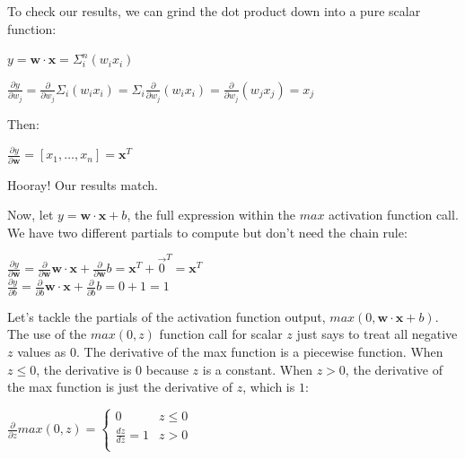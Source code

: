 \documentclass[11pt]{article}
\begin{document}
To check our results, we can grind the dot product down into a pure scalar function:

$y = \mathbf{w} \cdot \mathbf{x} = \Sigma_i^n (w_i x_i)$

$\frac{\partial y}{\partial w_j} = \frac{\partial}{\partial w_j} \Sigma_i (w_i x_i) = \Sigma_i \frac{\partial}{\partial w_j} (w_i x_i) = \frac{\partial}{\partial w_j} (w_j x_j) = x_j$

Then:

$\frac{\partial y}{\partial \mathbf{w}} = [ x_1, \ldots, x_n ] = \mathbf{x}^T$

Hooray! Our results match. 

Now, let $y = \mathbf{w} \cdot \mathbf{x} + b$, the full expression within the $max$ activation function call. We have two different partials to compute but don't need the chain rule:

$\frac{\partial y}{\partial \mathbf{w}} = \frac{\partial }{\partial \mathbf{w}}\mathbf{w} \cdot \mathbf{x} + \frac{\partial }{\partial \mathbf{w}}b = \mathbf{x}^T + \vec{0}^T = \mathbf{x}^T$\\
$\frac{\partial y}{\partial b} = \frac{\partial }{\partial b}\mathbf{w} \cdot \mathbf{x} + \frac{\partial }{\partial b}b = 0 + 1 = 1$

Let's tackle the partials of the activation function output, $max(0, \mathbf{w} \cdot \mathbf{x} + b)$. The use of the $max(0,z)$ function call for scalar $z$ just says to treat all negative $z$ values as 0.  The derivative of the max function is a piecewise function. When $z \leq 0$, the derivative is 0 because $z$ is a constant. When $z > 0$, the derivative of the max function is just the derivative of $z$, which is $1$:

$
\frac{\partial}{\partial z}max(0,z) =
	\begin{cases}
	0 & z \leq 0\\
	\frac{dz}{dz}=1 & z > 0\\
\end{cases}
$
\end{document}
